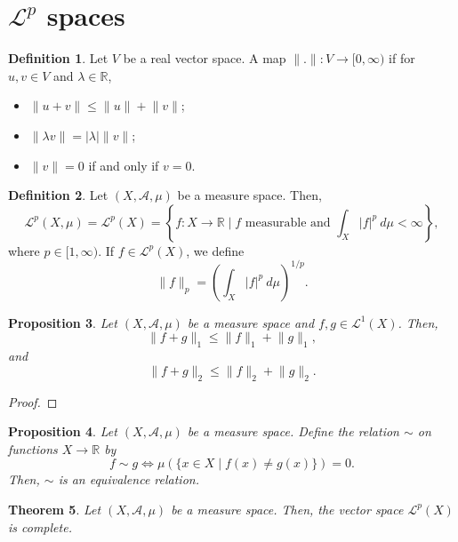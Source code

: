 \documentclass[a4paper, openany]{memoir}
\theoremstyle{definition}
\newtheorem{definition}{Definition}[section]
\theoremstyle{plain}
\newtheorem{theorem}[definition]{Theorem}
\newtheorem{proposition}[definition]{Proposition}
\begin{document}
    \section{$\mathcal{L}^p$ spaces}
    
    \begin{definition}
        Let $V$ be a real vector space. A map $\lVert . \rVert \colon V \to [0, \infty)$ if for $u, v \in V$ and $\lambda \in \mathbb{R}$,
        \begin{itemize}
            \item $\lVert u + v \rVert \leq \lVert u \rVert + \lVert v \rVert$;
            \item $\lVert \lambda v \rVert = |\lambda| \lVert v \rVert$;
            \item $\lVert v \rVert = 0$ if and only if $v = 0$.
        \end{itemize}
    \end{definition}

    \begin{definition}
        Let $(X, \mathcal{A}, \mu)$ be a measure space. Then,
        \[\mathcal{L}^p(X, \mu) = \mathcal{L}^p(X) = \left\{f \colon X \to \mathbb{R} \mid f \text{ measurable and } \int_X |f|^p \ d\mu < \infty \right\},\]
        where $p \in [1, \infty)$. If $f \in \mathcal{L}^p(X)$, we define
        \[\lVert f \rVert_p = \left(\int_X |f|^p \ d\mu\right)^{1/p}.\]
    \end{definition}

    \begin{proposition}
        Let $(X, \mathcal{A}, \mu)$ be a measure space and $f, g \in \mathcal{L}^1(X)$. Then,
        \[\lVert f + g \rVert_1 \leq \lVert f \rVert_1 + \lVert g \rVert_1,\]
        and
        \[\lVert f + g \rVert_2 \leq \lVert f \rVert_2 + \lVert g \rVert_2.\]
    \end{proposition}
    \begin{proof}
        
    \end{proof}

    \begin{proposition}
        Let $(X, \mathcal{A}, \mu)$ be a measure space. Define the relation $\sim$ on functions $X \to \mathbb{R}$ by
        \[f \sim g \iff \mu (\{x \in X \mid f(x) \neq g(x)\}) = 0.\]
        Then, $\sim$ is an equivalence relation.
    \end{proposition}

    \begin{theorem}
        Let $(X, \mathcal{A}, \mu)$ be a measure space. Then, the vector space $\mathcal{L}^p(X)$ is complete.
    \end{theorem}
\end{document}
